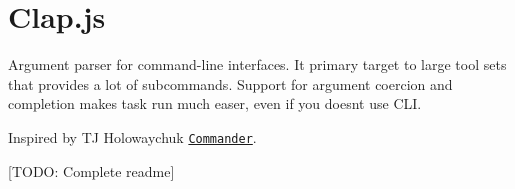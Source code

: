 \href{https://www.npmjs.com/package/clap}{\tt } \href{https://david-dm.org/lahmatiy/clap}{\tt } \href{https://travis-ci.org/lahmatiy/clap}{\tt }

\section*{Clap.\+js}

Argument parser for command-\/line interfaces. It primary target to large tool sets that provides a lot of subcommands. Support for argument coercion and completion makes task run much easer, even if you doesn\textquotesingle{}t use C\+LI.

Inspired by TJ Holowaychuk \href{https://github.com/visionmedia/commander.js}{\tt Commander}.

\mbox{[}T\+O\+DO\+: Complete readme\mbox{]} 
